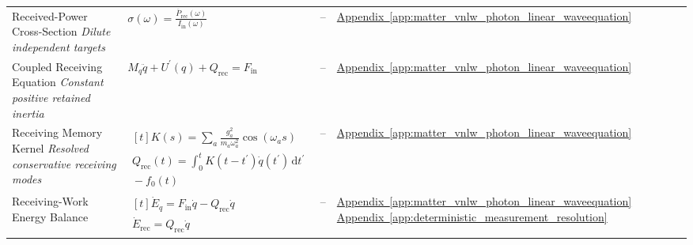 \begin{longtable}{@{} p{4.5cm} p{6cm} c p{4cm} @{}}
{\raggedright Received-Power Cross-Section \newline \textit{Dilute independent targets}\par} & {\raggedright $\sigma(\omega)=\frac{\overline P_{\mathrm{rec}}(\omega)}{I_{\mathrm{in}}(\omega)}$\par} & -- & {\raggedright \hyperref[app:matter_vnlw_photon_linear_waveequation]{Appendix~\ref*{app:matter_vnlw_photon_linear_waveequation}}\par} \\

{\raggedright Coupled Receiving Equation \newline \textit{Constant positive retained inertia}\par} & {\raggedright $M_q\ddot q+U^{\prime}(q)+Q_{\mathrm{rec}}=F_{\mathrm{in}}$\par} & -- & {\raggedright \hyperref[app:matter_vnlw_photon_linear_waveequation]{Appendix~\ref*{app:matter_vnlw_photon_linear_waveequation}}\par} \\

{\raggedright Receiving Memory Kernel \newline \textit{Resolved conservative receiving modes}\par} & {\raggedright $\begin{gathered}[t]K(s)=\sum_a\frac{g_a^2}{m_a\omega_a^2}\cos(\omega_a s) \\ Q_{\mathrm{rec}}(t)=\int_0^tK(t-t^{\prime})\dot q(t^{\prime})\,\mathrm dt^{\prime} \\ {}-f_0(t)\end{gathered}$\par} & -- & {\raggedright \hyperref[app:matter_vnlw_photon_linear_waveequation]{Appendix~\ref*{app:matter_vnlw_photon_linear_waveequation}}\par} \\

{\raggedright Receiving-Work Energy Balance\par} & {\raggedright $\begin{gathered}[t]\dot E_q=F_{\mathrm{in}}\dot q-Q_{\mathrm{rec}}\dot q \\ \dot E_{\mathrm{rec}}=Q_{\mathrm{rec}}\dot q\end{gathered}$\par} & -- & {\raggedright \hyperref[app:matter_vnlw_photon_linear_waveequation]{Appendix~\ref*{app:matter_vnlw_photon_linear_waveequation}} \newline \hyperref[app:deterministic_measurement_resolution]{Appendix~\ref*{app:deterministic_measurement_resolution}}\par} \\


\end{longtable}
